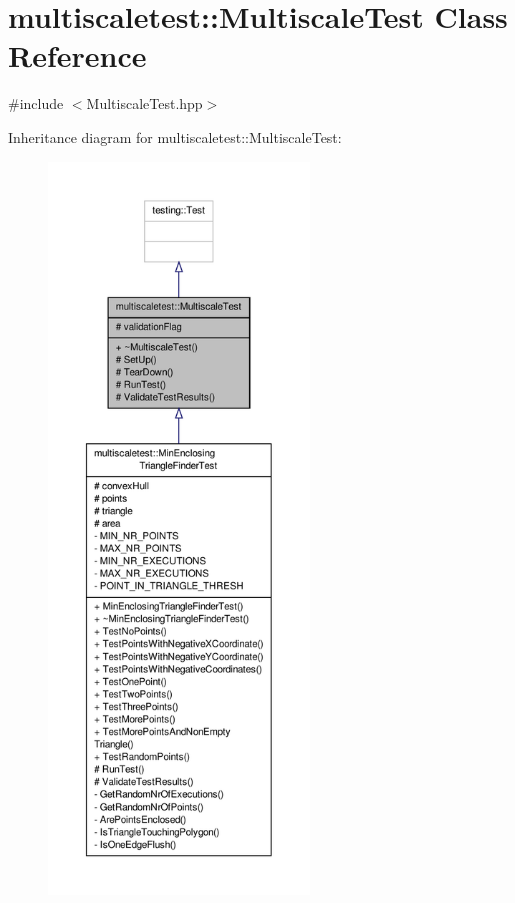 \hypertarget{classmultiscaletest_1_1MultiscaleTest}{\section{multiscaletest\-:\-:Multiscale\-Test Class Reference}
\label{classmultiscaletest_1_1MultiscaleTest}
}


{\ttfamily \#include $<$Multiscale\-Test.\-hpp$>$}



Inheritance diagram for multiscaletest\-:\-:Multiscale\-Test\-:
\nopagebreak
\begin{figure}[H]
\begin{center}
\leavevmode
\includegraphics[height=550pt]{classmultiscaletest_1_1MultiscaleTest__inherit__graph}
\end{center}
\end{figure}


